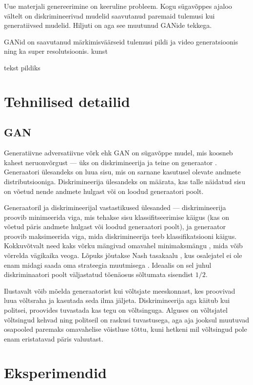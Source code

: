 \documentclass{vilgym}
\begin{document}
    Uue materjali genereerimine on keeruline probleem. Kogu sügavõppes ajaloo vältelt on diskrimineerivad mudelid saavutanud paremaid tulemusi kui generatiivsed mudelid. Hiljuti on aga see muutunud GANide tekkega.

    GANid on saavutanud märkimisväärseid tulemusi pildi ja video generatsioonis ning ka super resolutsioonis. kunst

    tekst pildiks

    \section{Tehnilised detailid}
    \subsection{GAN}
    Generatiivne adversatiivne võrk ehk GAN on sügavõppe mudel, mis koosneb kahest neruonvõrgust --- üks on diskrimineerija  ja teine on generaator .  Generaatori ülesandeks on luua sisu, mis on sarnane kasutusel olevate andmete distributsiooniga. Diskrimineerija ülesandeks on määrata, kas talle näidatud sisu on võetud nende andmete hulgast või on loodud generaatori poolt.
    
    Generaatoril ja diskrimineerijal vastastikused ülesanded --- diskrimineerija proovib minimeerida viga, mis tehakse sisu klassifitseerimise käigus (kas on võetud päris andmete hulgast või loodud generaatori poolt), ja generaator proovib maksimeerida viga, mida diskrimineerija teeb klassifikatsiooni käigus. Kokkuvõtvalt need kaks võrku mängivad omavahel minimaksmängu , mida võib võrrelda vägikaika veoga. Lõpuks jõutakse Nash tasakaalu , kus osalejatel ei ole enam midagi saada oma strateegia muutmisega \parencite{gametheory}. Ideaalis on sel juhul diskriminaatori poolt väljastatud tõenäosus  sõltumata sisendist $ 1/2 $.

    Ilustavalt võib mõelda generaatorist kui võltsjate meeskonnast, kes proovivad luua võltsraha ja kasutada seda ilma jäljeta. Diskrimineerija aga käitub kui politsei, proovides tuvastada kas tegu on võltsinguga. Alguses on võltsjatel võltsingud kehvad ning politseil on raskusi tuvastusega, aga aja jooksul muutuvad osapooled paremaks omavahelise võistluse tõttu, kuni hetkeni mil võltsingud pole enam eristatavad päris valuutast.

    \section{Eksperimendid}


    \nocite{*} %
    \printbibliography[title={Kasutatud allikad}]
\end{document}
